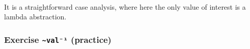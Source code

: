 \begin{fence}
\begin{code}%
\>[0]\AgdaSpace{}%
\AgdaSymbol{:}\AgdaSpace{}%
\AgdaSpace{}%
\AgdaSymbol{\{}\AgdaSpace{}%
\AgdaSymbol{\}}\AgdaSpace{}%
\AgdaSymbol{\{}\AgdaSpace{}%
\AgdaSpace{}%
\AgdaSymbol{:}\AgdaSpace{}%
\AgdaSpace{}%
\AgdaSpace{}%
\AgdaSymbol{\}}\<%
\\
\>[0][@{}l@{\AgdaIndent{0}}]%
\>[2]\AgdaSpace{}%
\AgdaSpace{}%
\AgdaOperator{\AgdaDatatype{\textasciitilde{}}}\AgdaSpace{}%
\<%
\\
%
\>[2]%
\>[136I]\AgdaSpace{}%
\<%
\\
\>[.][@{}l@{}]\<[136I]%
\>[4]\AgdaComment{--------}\<%
\\
%
\>[2]\AgdaSpace{}%
\AgdaSpace{}%
\<%
\\
\>[0]\AgdaSpace{}%
%
\>[18]\AgdaSymbol{()}\<%
\\
\>[0]\AgdaSpace{}%
\AgdaSymbol{(}\AgdaSpace{}%
\AgdaSymbol{)}%
\>[18]%
\>[23]\AgdaSymbol{=}%
\>[26]\<%
\\
\>[0]\AgdaSpace{}%
\AgdaSymbol{(}\AgdaSpace{}%
\AgdaSpace{}%
\AgdaSymbol{)}%
\>[18]\AgdaSymbol{()}\<%
\\
\>[0]\AgdaSpace{}%
\AgdaSymbol{(}\AgdaSpace{}%
\AgdaSpace{}%
\AgdaSymbol{)}\AgdaSpace{}%
\AgdaSymbol{()}\<%
\end{code}
\end{fence}

It is a straightforward case analysis, where here the only value of
interest is a lambda abstraction.

\hypertarget{exercise-valuxb9-practice}{%
\subsubsection{\texorpdfstring{Exercise \texttt{\textasciitilde{}val⁻¹}
(practice)}{Exercise \textasciitilde val⁻¹ (practice)}}\label{exercise-valuxb9-practice}}

